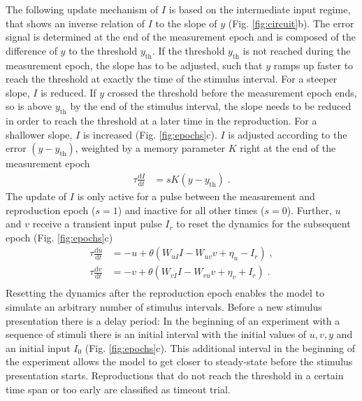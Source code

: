 \documentclass[10pt]{article}
\begin{document}
The following update mechanism of $I$ is based on the intermediate input regime, that shows an inverse relation of $I$ to the slope of $y$ (Fig. \ref{fig:circuit}b).
The error signal is determined at the end of the measurement epoch and is composed of the difference of $y$ to the threshold $y_{\text{th}}$.
If the threshold $y_{\text{th}}$ is not reached during the measurement epoch, the slope has to be adjusted, such that $y$ ramps up faster to reach the threshold at exactly the time of the stimulus interval. For a steeper slope, $I$ is reduced.
If $y$ crossed the threshold before the measurement epoch ends, so is above $y_{\text{th}}$ by the end of the stimulus interval, the slope needs to be reduced in order to reach the threshold at a later time in the reproduction. For a shallower slope, $I$ is increased (Fig. \ref{fig:epochs}c).
$I$ is adjusted according to the error $(y-y_{\text{th}})$, weighted by a memory parameter $K$ right at the end of the measurement epoch
\begin{equation} \label{Iupdate}
	\begin{split}
	\tau\frac{\text{d}I}{\text{d}t} & = sK(y-y_{\text{th}}) \;.
	\end{split}
\end{equation}
The update of $I$ is only active for a pulse between the measurement and reproduction epoch ($s=1$) and inactive for all other times ($s=0$).
Further, $u$ and $v$ receive a transient input pulse $I_r$ to reset the dynamics for the subsequent epoch (Fig. \ref{fig:epochs}c)
\begin{equation} \label{experimentcircuit}
	\begin{split}
	\tau\frac{\text{d}u}{\text{d}t} & = -u + \theta(W_{uI}I - W_{uv}v + \eta_u - I_r) \;,\\
	\tau\frac{\text{d}v}{\text{d}t} & = -v + \theta(W_{vI}I - W_{vu}v + \eta_v + I_r) \;.\\
	\end{split}
\end{equation}
Resetting the dynamics after the reproduction epoch enables the model to simulate an arbitrary number of stimulus intervals. 
Before a new stimulus presentation there is a delay period: In the beginning of an experiment with a sequence of stimuli there is an initial interval with the initial values of $u, v, y$ and an initial input $I_0$ (Fig. \ref{fig:epochs}c). 
This additional interval in the beginning of the experiment allows the model to get closer to steady-state before the stimulus presentation starts. 
Reproductions that do not reach the threshold in a certain time span  or too early are classified as timeout trial.
\end{document}
